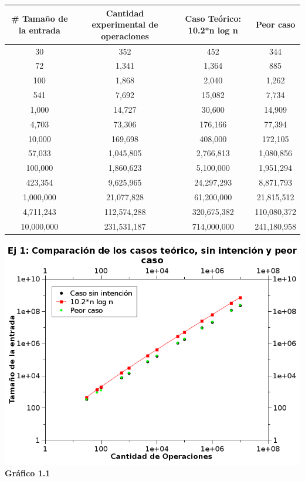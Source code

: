 \documentclass[a4paper, 10pt]{article}
\begin{document}
\begin{center}
\begin{tabular}{|c|c|c|c|}
\hline
\# Tamaño de la entrada & Cantidad experimental de operaciones & Caso Teórico: 10.2$*$n log n & Peor caso\\
\hline
30 & 352 & 452 & 344\\
\hline
72 & 1,341 & 1,364 & 885\\
\hline
100 & 1,868 & 2,040 & 1,262\\
\hline
541 & 7,692 & 15,082 & 7,734\\
\hline
1,000 & 14,727 & 30,600 & 14,909\\
\hline
4,703 & 73,306 & 176,166 & 77,394\\
\hline
10,000 & 169,698 & 408,000 & 172,105\\
\hline
57,033 & 1,045,805 & 2,766,813 & 1,080,856\\
\hline
100,000 & 1,860,623 & 5,100,000 & 1,951,294\\
\hline
423,354 & 9,625,965 & 24,297,293 & 8,871,793\\
\hline
1,000,000 & 21,077,828 & 61,200,000 & 21,815,512\\
\hline
4,711,243 & 112,574,288 & 320,675,382 & 110,080,372\\
\hline
10,000,000 & 231,531,187 & 714,000,000 & 241,180,958\\
\hline
\end{tabular}
\end{center} \vspace{0,15cm}


\begin{center}
\includegraphics[scale=0.60]{graficos/1-ej.png} \\
\scriptsize{\textsf{\textbf{Gr\'afico 1.1}}}  \\
\end{center}
\end{document}
